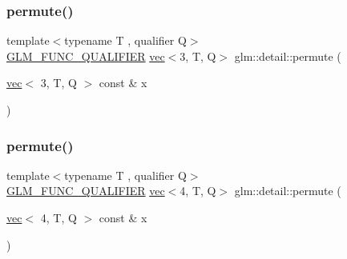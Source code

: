 \mbox{\label{namespaceglm_1_1detail_aa0f0fcedee25b7de5b7174df40fef4e4}} 
\subsubsection{\texorpdfstring{permute()}{permute()}\hspace{0.1cm}{\footnotesize\ttfamily [3/4]}}
{\footnotesize\ttfamily template$<$typename T , qualifier Q$>$ \\
\mbox{\hyperlink{setup_8hpp_a33fdea6f91c5f834105f7415e2a64407}{G\+L\+M\+\_\+\+F\+U\+N\+C\+\_\+\+Q\+U\+A\+L\+I\+F\+I\+ER}} \mbox{\hyperlink{structglm_1_1vec}{vec}}$<$3, T, Q$>$ glm\+::detail\+::permute (\begin{DoxyParamCaption}\item[{\mbox{\hyperlink{structglm_1_1vec}{vec}}$<$ 3, T, Q $>$ const \&}]{x }\end{DoxyParamCaption})}

\mbox{\label{namespaceglm_1_1detail_a3943594f7c636dd1d021cd23f4e22441}} 
\subsubsection{\texorpdfstring{permute()}{permute()}\hspace{0.1cm}{\footnotesize\ttfamily [4/4]}}
{\footnotesize\ttfamily template$<$typename T , qualifier Q$>$ \\
\mbox{\hyperlink{setup_8hpp_a33fdea6f91c5f834105f7415e2a64407}{G\+L\+M\+\_\+\+F\+U\+N\+C\+\_\+\+Q\+U\+A\+L\+I\+F\+I\+ER}} \mbox{\hyperlink{structglm_1_1vec}{vec}}$<$4, T, Q$>$ glm\+::detail\+::permute (\begin{DoxyParamCaption}\item[{\mbox{\hyperlink{structglm_1_1vec}{vec}}$<$ 4, T, Q $>$ const \&}]{x }\end{DoxyParamCaption})}

\mbox{\label{namespaceglm_1_1detail_a45b170ea667900227c6849ad1dfe1bf5}} 
